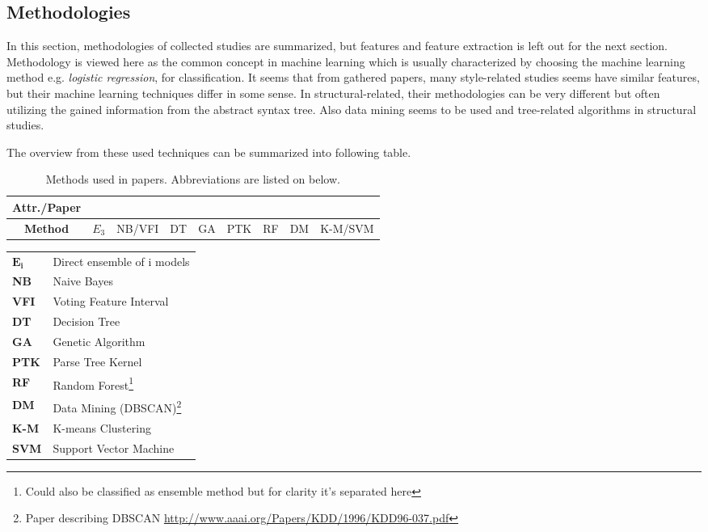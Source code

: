 \documentclass[english]{tktltiki2}
\theoremstyle{definition}
\theoremstyle{remark}
\begin{document}
\subsection{Methodologies}
\label{chap:meth}
In this section, methodologies of collected studies are summarized, but features and feature extraction is left out for the next section. Methodology is viewed here as the common concept in machine learning which is usually characterized by choosing the machine learning method e.g. \textit{logistic regression}, for classification. It seems that from gathered papers, many style-related studies seems have similar features, but their machine learning techniques differ in some sense. In structural-related, their methodologies can be very different but often utilizing the gained information from the abstract syntax tree. Also data mining seems to be used and tree-related algorithms in structural studies.  

The overview from these used techniques can be summarized into following table.

\begin{table}[ht]
\centering
\begin{tabular}{c|cccccccc}
\textbf{Attr./Paper} & \cite{bandara2011machine}   & \cite{kothari2007probabilistic}   & \cite{Elenbogen:2008:DOS:1295109.1295123}  & \cite{lange2007using}    & \cite{Son:2013:APS:2508269.2508323}   & \cite{caliskan2015anonymizing}    & \cite{jadalla2008pde4java}   & \cite{rosenblum2011wrote}   \\ \hline
\textbf{Method}        & $E_3$ & NB/VFI & DT & GA & PTK & RF  & DM & K-M/SVM \\
\end{tabular}
\caption{Methods used in papers. Abbreviations are listed on below.}
\label{table:meth}
\end{table}

\begin{longtable}{ll}

{$\mathbf{E_i}$} & Direct ensemble of i models \\
\textbf{NB} & Naive Bayes\\
\textbf{VFI} & Voting Feature Interval\\
\textbf{DT} & Decision Tree\\
\textbf{GA} & Genetic Algorithm\\
\textbf{PTK} & Parse Tree Kernel\\
\textbf{RF} & Random Forest\footnote{Could also be classified as ensemble method but for clarity it's separated here}\\
\textbf{DM} & Data Mining (DBSCAN)\footnote{Paper describing DBSCAN \url{http://www.aaai.org/Papers/KDD/1996/KDD96-037.pdf}}\\
\textbf{K-M} & K-means Clustering\\
\textbf{SVM} & Support Vector Machine

\end{longtable}
\end{document}
